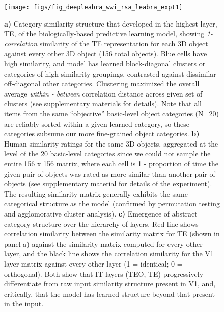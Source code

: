 \documentclass[12pt,twoside]{article}
\newif\myifpdf
\begin{document}
\begin{figure}
  \centering\texttt{[image: figs/fig\_deepleabra\_wwi\_rsa\_leabra\_expt1]}
  \caption{\small {\bf a)} Category similarity structure that developed in the highest layer, TE, of the biologically-based predictive learning model, showing {\em 1-correlation} similarity of the TE representation for each 3D object against every other 3D object (156 total objects). Blue cells have high similarity, and model has learned block-diagonal clusters or categories of high-similarity groupings, contrasted against dissimilar off-diagonal other categories.  Clustering maximized the overall average {\em within - between} correlation distance across given set of clusters (see supplementary materials for details).  Note that all items from the same ``objective'' basic-level object categories (N=20) are reliably sorted within a given learned category, so these categories subsume our more fine-grained object categories. {\bf b)} Human similarity ratings for the same 3D objects, aggregated at the level of the 20 basic-level categories since we could not sample the entire 156 x 156 matrix, where each cell is 1 - proportion of time the given pair of objects was rated as more similar than another pair of objects (see supplementary material for details of the experiment).  The resulting similarity matrix generally exhibits the same categorical structure as the model (confirmed by permutation testing and agglomorative cluster analysis).  {\bf c)} Emergence of abstract category structure over the hierarchy of layers.  Red line shows correlation similarity between the similarity matrix for TE (shown in panel a) against the similarity matrix computed for every other layer, and the black line shows the correlation similarity for the V1 layer matrix against every other layer (1 = identical; 0 = orthogonal). Both show that IT layers (TEO, TE) progressively differentiate from raw input similarity structure present in V1, and, critically, that the model has learned structure beyond that present in the input.}
  \label{fig.rsa}
\end{figure}

\end{document}
